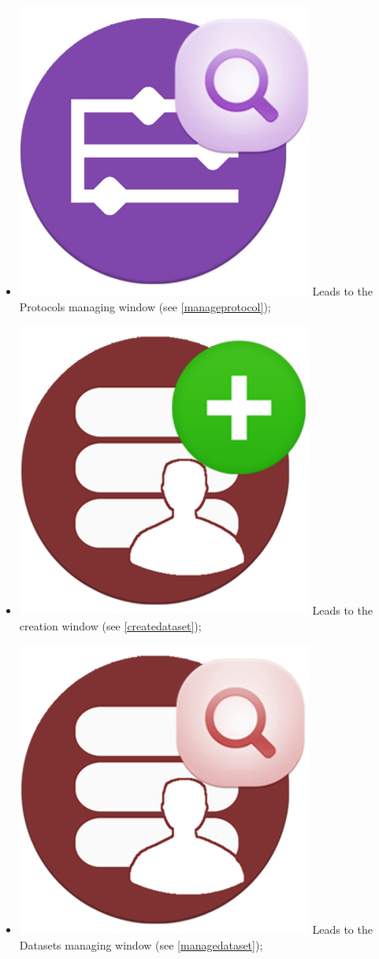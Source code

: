 \begin{itemize}
\item \includegraphics[scale=0.08]{./Images/manage_Protocols} Leads to the Protocols\g{} managing window (see \ref{manageprotocol});
\item \includegraphics[scale=0.08]{./Images/new_Dataset} Leads to the \dataset{} creation window (see \ref{createdataset});
\item \includegraphics[scale=0.08]{./Images/manage_Datasets} Leads to the Datasets\g{} managing window (see \ref{managedataset});

\end{itemize}
